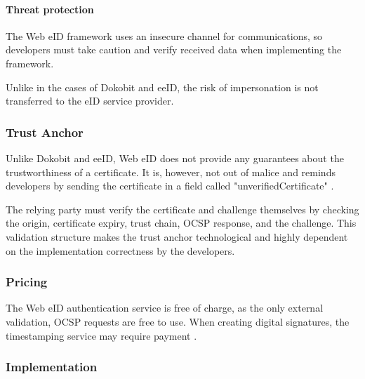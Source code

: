 \paragraph{Threat protection}

The Web eID framework uses an insecure channel for communications, so developers must take caution and verify received data when implementing the framework.

Unlike in the cases of Dokobit and eeID, the risk of impersonation is not transferred to the eID service provider.


\subsubsection{Trust Anchor}

Unlike Dokobit and eeID, Web eID does not provide any guarantees about the trustworthiness of a certificate. It is, however, not out of malice and reminds developers by sending the certificate in a field called "unverifiedCertificate" \cite{ria-webeid-source-web-eid-authtoken-validation-java-readme}.

The relying party must verify the certificate and challenge themselves by checking the origin, certificate expiry, trust chain, OCSP response, and the challenge. This validation structure makes the trust anchor technological and highly dependent on the implementation correctness by the developers.


\subsubsection{Pricing}

The Web eID authentication service is free of charge, as the only external validation, OCSP \cite{rfc6960} requests are free to use. When creating digital signatures, the timestamping service may require payment \cite{ria-webeid-source-web-eid-authtoken-validation-java-readme}.

\subsubsection{Implementation}

